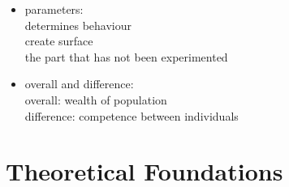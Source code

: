 \documentclass{article}
\begin{document}
\begin{itemize}
	\item parameters:\\
		determines behaviour\\
		create surface\\
		the part that has not been experimented\\

	\item overall and difference:\\
		overall: wealth of population\\
		difference: competence between individuals\\

\end{itemize}

\section{Theoretical Foundations}
\end{document}

